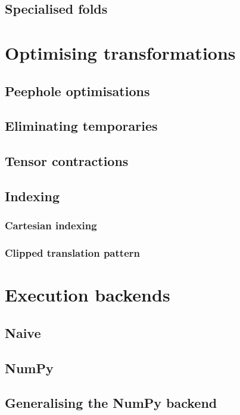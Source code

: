 \subsection{Specialised folds}

\section{Optimising transformations}

\subsection{Peephole optimisations}

\subsection{Eliminating temporaries}

\subsection{Tensor contractions}

\subsection{Indexing}

\subsubsection{Cartesian indexing}

\subsubsection{Clipped translation pattern}

\section{Execution backends}

\subsection{Naive}

\subsection{NumPy}

\subsection{Generalising the NumPy backend}


